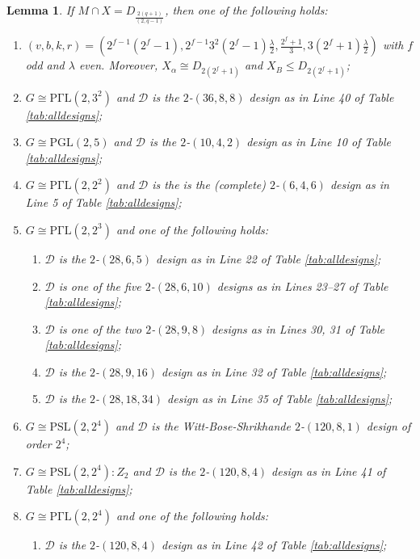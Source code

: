 \documentclass[a4paper,twopage,reqno,12pt]{amsart}
\newtheorem{lemma}[theorem]{Lemma}
\theoremstyle{definition}
\numberwithin{equation}{section}
\newcommand{\PSL}{\mathrm{PSL}}
\newcommand{\PGL}{\mathrm{PGL}}
\newcommand{\PGaL}{\mathrm{P\Gamma L}}
\renewcommand{\S}{\mathrm{S}}
\renewcommand{\leq}{\leqslant}
\begin{document}
\begin{lemma}\label{MinTX8} If $M\cap X=D_{\frac{2(q+1)}{(2,q-1)}}$, then one of the following holds:
\begin{enumerate}
    \item $\left(v,b,k,r\right)=\left(2^{f-1}(2^{f}-1),2^{f-1}3^{2}(2^{f}-1)\frac{\lambda }{2},\frac{2^{f}+1}{3},3(2^{f}+1)\frac{\lambda }{2}\right)$ with $f$ odd and $\lambda$ even. Moreover, $X_{\alpha}\cong D_{2(2^f+1)}$ and $X_{B}\leq D_{2(2^f+1)}$;
    \item $G\cong \PGaL(2,3^2)$ and $\mathcal{D}$
        is the $2$-$(36,8,8)$ design as in Line 40 of Table \ref{tab:alldesigns};
    \item $G\cong \PGL(2,5)$ and $\mathcal{D}$ is the $2$-$(10,4,2)$ design as in Line 10 of Table \ref{tab:alldesigns};
    \item $G\cong \PGaL(2,2^2)$ and $\mathcal{D}$ is the is the (complete) $2$-$(6,4,6)$ design as in Line 5 of Table \ref{tab:alldesigns};
    \item $G\cong \PGaL(2,2^3)$ and one of the following holds:
    \begin{enumerate}
        \item $\mathcal{D}$ is the $2$-$(28,6,5)$ design as in Line 22 of Table \ref{tab:alldesigns};
        \item $\mathcal{D}$ is one of the five $2$-$(28,6,10)$ designs as in Lines 23--27 of Table \ref{tab:alldesigns};
        \item $\mathcal{D}$ is one of the two $2$-$(28,9,8)$ designs as in Lines 30, 31 of Table \ref{tab:alldesigns};
        \item $\mathcal{D}$ is the $2$-$(28,9,16)$ design as in Line 32 of Table \ref{tab:alldesigns};
        \item $\mathcal{D}$ is the $2$-$(28,18,34)$ design as in Line 35 of Table \ref{tab:alldesigns};
    \end{enumerate}
    \item $G\cong \PSL(2,2^{4})$ and $\mathcal{D}$ is the Witt-Bose-Shrikhande $2$-$(120,8,1)$ design of order $2^4$;
    \item $G\cong \PSL(2,2^4):Z_{2}$ and $\mathcal{D}$ is the $2$-$(120,8,4)$ design as in Line 41 of Table \ref{tab:alldesigns};
    \item $G\cong \PGaL(2,2^4)$ and one of the following holds:
    \begin{enumerate}
        \item $\mathcal{D}$ is the $2$-$(120,8,4)$ design as in Line 42 of Table \ref{tab:alldesigns};


\end{enumerate}
\end{enumerate}
\end{lemma}
\end{document}
